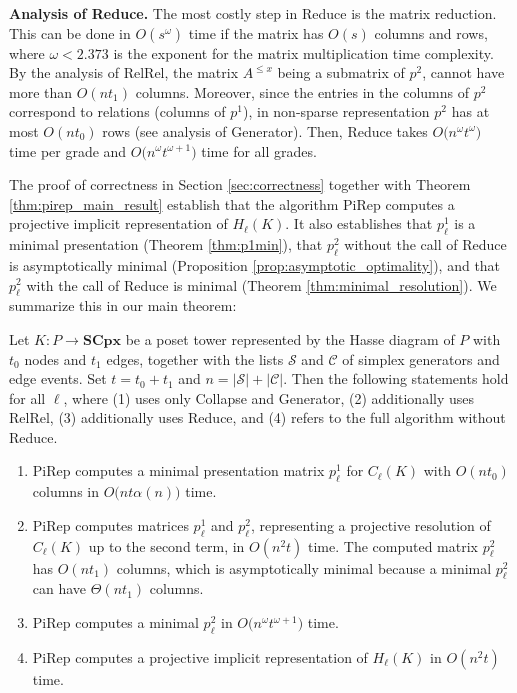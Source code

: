 \documentclass[english,a4paper,nolineno,cleveref]{socg-lipics-v2021}
\begin{document}
\vspace{2pt}
{\bf Analysis of {\sc Reduce}.} The most costly step in {\sc Reduce} is the matrix
reduction. This can be done in $O(s^\omega)$ time 
if the matrix has $O(s)$ columns and rows, where $\omega< 2.373$ is the exponent for the
matrix multiplication time complexity. By the analysis of {\sc RelRel}, the matrix $A^{\leq x}$ being a submatrix
of $p^2$, cannot have more than $O(nt_1)$ columns. Moreover, since the entries in the columns of $p^2$ correspond to relations (columns of $p^1$), in non-sparse representation $p^2$ has at most $O(nt_0)$ rows (see analysis of {\sc Generator}). Then, {\sc Reduce} takes $O\big(n^\omega t^\omega)$ time per grade and $O\big(n^\omega t^{\omega+1})$ time for all grades. 


The proof of correctness in Section \ref{sec:correctness} together with Theorem \ref{thm:pirep_main_result} establish that the algorithm {\sc PiRep} computes a projective implicit representation of $H_\ell(K)$. It also establishes that $p^1_\ell$ is a minimal presentation (Theorem \ref{thm:p1min}), that $p^2_\ell$ without the call of {\sc Reduce} is asymptotically minimal (Proposition \ref{prop:asymptotic_optimality}), and that $p^2_\ell$ with the call of {\sc Reduce} is minimal (Theorem \ref{thm:minimal_resolution}). We summarize this in our main theorem:

\begin{theorem} \label{thm:algorithm_complexity}
Let $K\colon P\rightarrow \mathbf{SCpx}$ be a poset tower represented by the Hasse diagram of $P$ with $t_0$ nodes and $t_1$ edges, together with the lists $\mathcal S$ and $\mathcal C$ of simplex generators and edge events. Set $t=t_0+t_1$ and $n=|\mathcal S|+|\mathcal C|$. Then the following statements hold for all $\ell$, where (1) uses only {\sc Collapse} and {\sc Generator}, (2) additionally uses {\sc RelRel}, (3) additionally uses  {\sc Reduce}, and (4) refers to the full algorithm without {\sc Reduce}.  \vspace{1pt}
\begin{enumerate}
\item {\sc PiRep} computes a minimal presentation matrix $p_\ell^1$ for $C_\ell(K)$ with $O(nt_0)$ columns in $O\big(nt\alpha(n)\big)$ time. \vspace{1pt}

\item {\sc PiRep} computes matrices $p_\ell^1$ and $p_\ell^2$, representing a projective resolution of $C_\ell(K)$ up to the second term, in $O(n^2t)$ time. The computed matrix $p_\ell^2$ has $O(nt_1)$ columns, which is asymptotically minimal because a minimal $p_\ell^2$ can have $\Theta(nt_1)$ columns. \vspace{1pt}

\item {\sc PiRep} computes a minimal $p_\ell^2$ in $O\big(n^\omega t^{\omega+1})$ time. \vspace{1pt}

\item {\sc PiRep} computes a projective implicit representation of $H_\ell(K)$ in $O(n^2t)$ time.
\end{enumerate}
\end{theorem}
\end{document}
